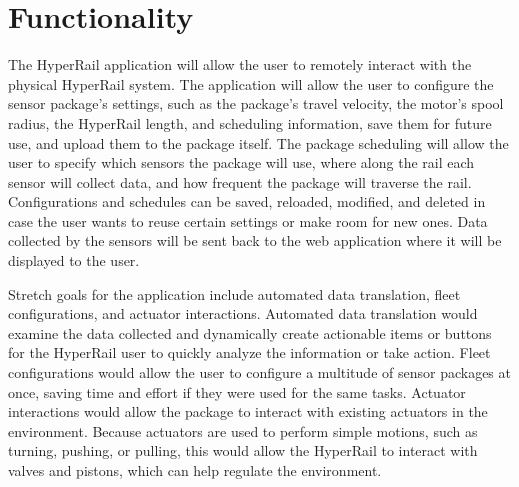\documentclass[onecolumn, draftclsnofoot,10pt, compsoc]{IEEEtran}
\begin{document}
\section{Functionality}
The HyperRail application will allow the user to remotely interact with the physical HyperRail system. The application will allow the user to configure the sensor package's settings, such as the package's travel velocity, the motor's spool radius, the HyperRail length, and scheduling information, save them for future use, and upload them to the package itself. The package scheduling will allow the user to specify which sensors the package will use, where along the rail each sensor will collect data, and how frequent the package will traverse the rail. Configurations and schedules can be saved, reloaded, modified, and deleted in case the user wants to reuse certain settings or make room for new ones. Data collected by the sensors will be sent back to the web application where it will be displayed to the user.

Stretch goals for the application include automated data translation, fleet configurations, and actuator interactions. Automated data translation would examine the data collected and dynamically create actionable items or buttons for the HyperRail user to quickly analyze the information or take action. Fleet configurations would allow the user to configure a multitude of sensor packages at once, saving time and effort if they were used for the same tasks. Actuator interactions would allow the package to interact with existing actuators in the environment. Because actuators are used to perform simple motions, such as turning, pushing, or pulling, this would allow the HyperRail to interact with valves and pistons, which can help regulate the environment.


\end{document}
